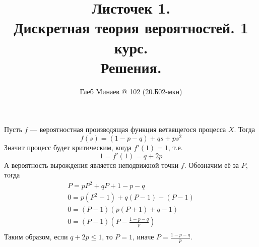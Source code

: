 \documentclass[12pt,a4paper]{article}
\title{Листочек 1.\\Дискретная теория вероятностей. 1 курс.\\Решения.}
\author{Глеб Минаев @ 102 (20.Б02-мкн)}
\begin{document}
    \maketitle

    \begin{multicols}{2}
        \tableofcontents
    \end{multicols}

    \breaker

    \begin{enumproblem}
        Пусть $f$ --- вероятностная производящая функция ветвящегося процесса $X$. Тогда
        \[f(s) = (1-p-q) + qs + ps^2\]
        Значит процесс будет критическим, когда $f'(1) = 1$, т.е.
        \[1 = f'(1) = q + 2p\]
        А вероятность вырождения является неподвижной точки $f$. Обозначим её за $P$, тогда
        \begin{gather*}
            P = p P^2 + q P + 1 - p - q\\
            0 = p (P^2 - 1) + q (P - 1) - (P - 1)\\
            0 = (P - 1)(p (P + 1) + q - 1)\\
            0 = (P - 1)(P - \frac{1 - p - q}{p})\\
        \end{gather*}
        Таким образом, если $q + 2p \leqslant 1$, то $P = 1$, иначе $P = \frac{1 - p - q}{p}$.
    \end{enumproblem}
\end{document}
